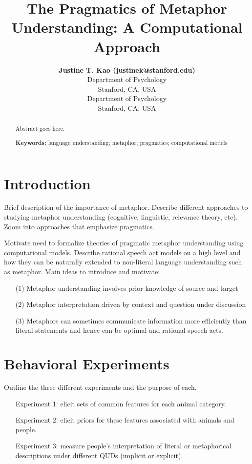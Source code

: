 \documentclass[10pt,letterpaper]{article}
\title{The Pragmatics of Metaphor Understanding: A Computational Approach}
\author{{\large \bf Justine T. Kao (justinek@stanford.edu)} \\
  Department of Psychology\\
  Stanford, CA, USA
  \AND {\large \bf Noah D. Goodman (ngoodman@stanford.edu)} \\
  Department of Psychology\\
  Stanford, CA, USA}
\begin{document}
\maketitle


\begin{abstract}
Abstract goes here.

\textbf{Keywords:} 
language understanding; metaphor; pragmatics; computational models
\end{abstract}


\section{Introduction}
Brief description of the importance of metaphor.
Describe different approaches to studying metaphor understanding (cognitive, linguistic, relevance theory, etc). Zoom into approaches that emphasize pragmatics. 

Motivate need to formalize theories of pragmatic metaphor understanding using computational models. Describe rational speech act models on a high level and how they can be naturally extended to non-literal language understanding such as metaphor. Main ideas to introduce and motivate:

\begin{itemize} 
\item[(1)] Metaphor understanding involves prior knowledge of source and target 
\item[(2)] Metaphor interpretation driven by context and question under discussion 
\item[(3)] Metaphors can sometimes communicate information more efficiently than literal statements and hence can be optimal and rational speech acts.
\end{itemize}

\section{Behavioral Experiments}
Outline the three different experiments and the purpose of each. 
\begin{itemize}
\item[]Experiment 1: elicit sets of common features for each animal category. 
\item[]Experiment 2: elicit priors for these features associated with animals and people. 
\item[]Experiment 3: measure people's interpretation of literal or metaphorical descriptions under different QUDs (implicit or explicit).
\end{itemize}
\end{document}
